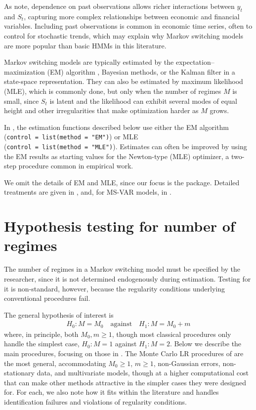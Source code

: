 As \citet{an2013identifiability} note, dependence on past observations allows richer interactions between \(y_t\) and \(S_t\), capturing more complex relationships between economic and financial variables. Including past observations is common in economic time series, often to control for stochastic trends, which may explain why Markov switching models are more popular than basic HMMs in this literature.

Markov switching models are typically estimated by the expectation--maximization (EM) algorithm \citep{dempster_maximum_1977}, Bayesian methods, or the Kalman filter in a state-space representation. They can also be estimated by maximum likelihood (MLE), which is commonly done, but only when the number of regimes \(M\) is small, since \(S_t\) is latent and the likelihood can exhibit several modes of equal height and other irregularities that make optimization harder as \(M\) grows.

In , the estimation functions described below use either the EM algorithm (\texttt{control\ =\ list(method\ =\ "EM")}) or MLE (\texttt{control\ =\ list(method\ =\ "MLE")}). Estimates can often be improved by using the EM results as starting values for the Newton-type (MLE) optimizer, a two-step procedure common in empirical work.

We omit the details of EM and MLE, since our focus is the  package. Detailed treatments are given in \citep{hamilton1990, hamilton1994}, and, for MS-VAR models, in \citet{krolzig1997markov}.

\section{Hypothesis testing for number of regimes}\label{testing}

The number of regimes in a Markov switching model must be specified by the researcher, since it is not determined endogenously during estimation. Testing for it is non-standard, however, because the regularity conditions underlying conventional procedures fail.

The general hypothesis of interest is
\begin{align*}
    H_0: M = M_0 \quad \text{against} \quad H_1: M = M_0 + m
\end{align*}
where, in principle, both \(M_0, m \geq 1\), though most classical procedures only handle the simplest case, \(H_0: M = 1\) against \(H_1: M = 2\). Below we describe the main procedures, focusing on those in . The Monte Carlo LR procedures of \citet{rodrondufour_mcmstest} are the most general, accommodating \(M_0 \geq 1\), \(m \geq 1\), non-Gaussian errors, non-stationary data, and multivariate models, though at a higher computational cost that can make other methods attractive in the simpler cases they were designed for. For each, we also note how it fits within the literature and handles identification failures and violations of regularity conditions.

